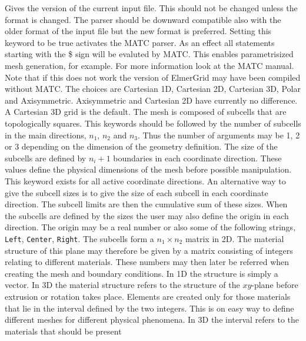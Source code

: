 \sifbegin
{}
Gives the version of the current input file. This should not be changed unless
the format is changed. The parser should be downward compatible also with the older
format of the input file but the new format is preferred.
%
Setting this keyword to be true activates the MATC parser. As an effect all statements 
starting with the \$ sign will be evaluted by MATC. This enables parametrisized mesh generation,
for example. For more information look at the MATC manual. Note that if this does not work the 
version of ElmerGrid may have been compiled without MATC. 
%
The choices are Cartesian 1D, Cartesian 2D, Cartesian 3D, Polar and 
Axisymmetric. Axisymmetric and Cartesian 2D have currently
no difference.
A Cartesian 3D grid is the default.
%
The mesh is composed of subcells that are 
topologically squares. 
This keywords should be followed by the 
number of subcells in the main directions,
$n_1$, $n_2$ and $n_3$.
Thus the number of 
arguments may be 1, 2 or 3 depending on the dimension of the geometry 
definition. 
The size of the subcells are defined by $n_i+1$ boundaries
in each coordinate direction. These values define the physical 
dimensions of the mesh before possible manipulation. 
This keyword exists for all active coordinate directions.  
%
An alternative way to give the subcell sizes is to give the size of 
each subcell in each coordinate direction. 
The subcell limits are then the cumulative sum of these sizes.
%
When the subcells are defined by the sizes the user may also define the origin 
in each direction. The origin may be a real number or also some of the following 
strings, \texttt{Left}, \texttt{Center}, \texttt{Right}.
%
The subcells form a $n_1 \times n_2$ matrix in 2D. 
The material structure of this plane may therefore be given by a matrix 
consisting of integers relating to different materials.
These numbers may then later be referred
when creating the mesh and boundary conditions.
In 1D the structure is simply a vector.
In 3D the material structure refers to the structure of the 
$xy$-plane before extrusion or rotation takes place. 
%
Elements are created only for those materials that 
lie in the interval defined by the two integers.
This is on easy way to define different meshes for different physical
phenomena.
In 3D the interval refers to the materials that should be present
